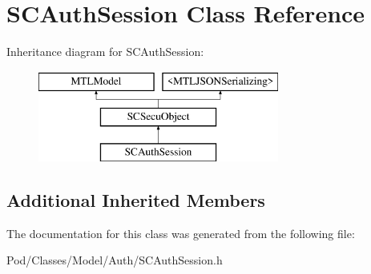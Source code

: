 \hypertarget{interface_s_c_auth_session}{}\section{S\+C\+Auth\+Session Class Reference}
\label{interface_s_c_auth_session}
Inheritance diagram for S\+C\+Auth\+Session\+:\begin{figure}[H]
\begin{center}
\leavevmode
\includegraphics[height=3.000000cm]{interface_s_c_auth_session}
\end{center}
\end{figure}
\subsection*{Additional Inherited Members}


The documentation for this class was generated from the following file\+:\begin{DoxyCompactItemize}
\item 
Pod/\+Classes/\+Model/\+Auth/S\+C\+Auth\+Session.\+h\end{DoxyCompactItemize}
